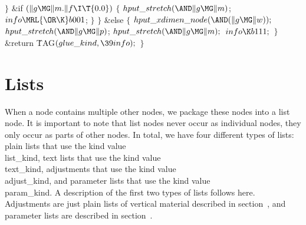 ${}\}{}$\2\6
\&{if} ${}(\|g\MG\|m.\|f\I\T{0.0}){}$\5
\1${}\{{}$\5
${}\index{hput stretch+\\{hput\_stretch}}\\{hput\_stretch}({\AND}\|g\MG\|m){}$;\5
${}\index{info+\\{info}}\\{info}\MRL{{\OR}{\K}}\\{b001}{}$;\5
${}\}{}$\2\6
\4${}\}{}$\2\6
\&{else}\6
\1${}\{{}$\5
${}\index{hput xdimen node+\\{hput\_xdimen\_node}}\\{hput\_xdimen\_node}({\AND}(\|g\MG\|w));{}$\6
${}\index{hput stretch+\\{hput\_stretch}}\\{hput\_stretch}({\AND}\|g\MG\|p){}$;\5
${}\index{hput stretch+\\{hput\_stretch}}\\{hput\_stretch}({\AND}\|g\MG\|m);{}$\6
${}\index{info+\\{info}}\\{info}\K\\{b111};{}$\6
\4${}\}{}$\2\6
\&{return} \.{TAG}${}(\index{glue kind+\\{glue\_kind}}\\{glue\_kind},\39\index{info+\\{info}}\\{info});{}$\6
\4${}\}{}$\2
\Y
\fi


\section{Lists}\hascode\label{lists}
When a node contains multiple other nodes, we package these nodes into a list node.
It is important to note that list nodes never occur as individual nodes,
they only occur as parts of other nodes.
In total, we have four different types of lists: plain lists that use the
kind value \\{list\_kind}, text lists that use the kind value \\{text\_kind},
adjustments that use the kind value \\{adjust\_kind},
and parameter lists that use the kind value \\{param\_kind}.
A description of the first two types of lists follows here.
Adjustments are just plain lists of vertical material described in section~, and
parameter lists are described in section~.

